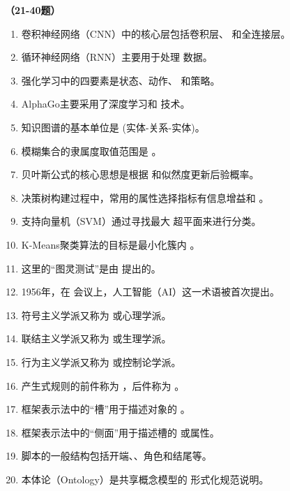 \vspace{1em}
\textbf{（21-40题）}
\begin{enumerate}[resume,leftmargin=2em,itemsep=1pt]
\item 卷积神经网络（CNN）中的核心层包括卷积层、\underline{\hspace{3em}} 和全连接层。
\item 循环神经网络（RNN）主要用于处理 \underline{\hspace{3em}} 数据。
\item 强化学习中的四要素是状态、动作、\underline{\hspace{3em}} 和策略。
\item AlphaGo主要采用了深度学习和 \underline{\hspace{3em}} 技术。
\item 知识图谱的基本单位是 \underline{\hspace{3em}} (实体-关系-实体)。
\item 模糊集合的隶属度取值范围是 \underline{\hspace{3em}}。
\item 贝叶斯公式的核心思想是根据 \underline{\hspace{3em}} 和似然度更新后验概率。
\item 决策树构建过程中，常用的属性选择指标有信息增益和 \underline{\hspace{3em}}。
\item 支持向量机（SVM）通过寻找最大 \underline{\hspace{3em}} 超平面来进行分类。
\item K-Means聚类算法的目标是最小化簇内 \underline{\hspace{3em}}。
\item 这里的“图灵测试”是由 \underline{\hspace{3em}} 提出的。
\item 1956年，在 \underline{\hspace{3em}} 会议上，人工智能（AI）这一术语被首次提出。
\item 符号主义学派又称为 \underline{\hspace{3em}} 或心理学派。
\item 联结主义学派又称为 \underline{\hspace{3em}} 或生理学派。
\item 行为主义学派又称为 \underline{\hspace{3em}} 或控制论学派。
\item 产生式规则的前件称为 \underline{\hspace{3em}}，后件称为 \underline{\hspace{3em}}。
\item 框架表示法中的“槽”用于描述对象的 \underline{\hspace{3em}}。
\item 框架表示法中的“侧面”用于描述槽的 \underline{\hspace{3em}} 或属性。
\item 脚本的一般结构包括开端、\underline{\hspace{3em}}、角色和结尾等。
\item 本体论（Ontology）是共享概念模型的 \underline{\hspace{3em}} 形式化规范说明。
\end{enumerate}

